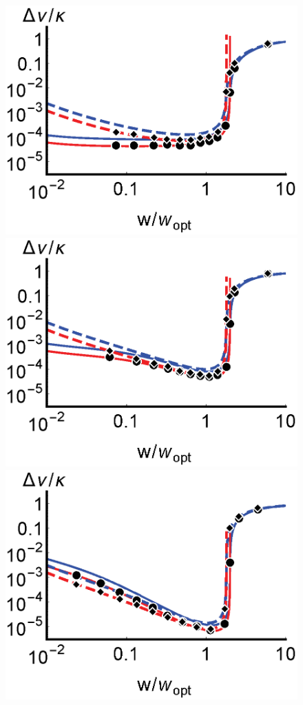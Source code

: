 \documentclass[aps,prl,twocolumn,
superscriptaddress,groupedaddress]{revtex4}
\begin{document}
\begin{figure}
\begin{center}
	\includegraphics[scale =0.51] {N10000LWS.eps}
	\hspace{-5.5mm} \includegraphics[scale =0.51] {N10000LWC.eps}
	\hspace{-5.5mm} \includegraphics[scale =0.51] {N10000LWL.eps}\\

\end{center}
\end{figure}
\end{document}
